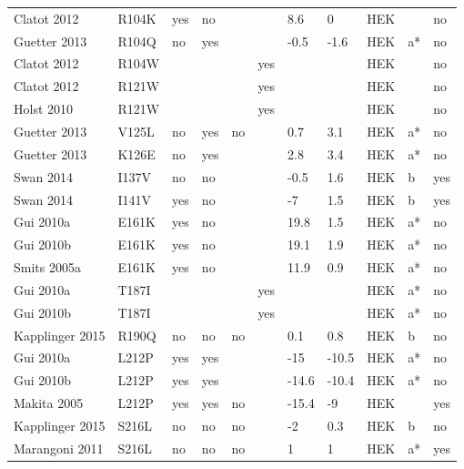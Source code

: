 \begin{tiny}
\begin{longtable}{p{4cm}|l|llll|ll|lll}
Clatot 2012\cite{Clatot2012MutationDB} & R104K & yes & no &  &  & 8.6 & 0 & HEK &  & no \\
Guetter 2013\cite{Guetter2013MutationDB} & R104Q & no & yes &  &  & -0.5 & -1.6 & HEK & a* & no \\
Clatot 2012\cite{Clatot2012MutationDB} & R104W &  &  &  & yes &  &  & HEK &  & no \\
Clatot 2012\cite{Clatot2012MutationDB} & R121W &  &  &  & yes &  &  & HEK &  & no \\
Holst 2010\cite{Holst2010MutationDB} & R121W &  &  &  & yes &  &  & HEK &  & no \\
Guetter 2013\cite{Guetter2013MutationDB} & V125L & no & yes & no &  & 0.7 & 3.1 & HEK & a* & no \\
Guetter 2013\cite{Guetter2013MutationDB} & K126E & no & yes &  &  & 2.8 & 3.4 & HEK & a* & no \\
Swan 2014\cite{Swan2014MutationDB} & I137V & no & no &  &  & -0.5 & 1.6 & HEK & b & yes \\
Swan 2014\cite{Swan2014MutationDB} & I141V & yes & no &  &  & -7 & 1.5 & HEK & b & yes \\
Gui 2010a\cite{Gui2010aMutationDB} & E161K & yes & no &  &  & 19.8 & 1.5 & HEK & a* & no \\
Gui 2010b\cite{Gui2010bMutationDB} & E161K & yes & no &  &  & 19.1 & 1.9 & HEK & a* & no \\
Smits 2005a\cite{Smits2005aMutationDB} & E161K & yes & no &  &  & 11.9 & 0.9 & HEK & a* & no \\
Gui 2010a\cite{Gui2010aMutationDB} & T187I &  &  &  & yes &  &  & HEK & a* & no \\
Gui 2010b\cite{Gui2010bMutationDB} & T187I &  &  &  & yes &  &  & HEK & a* & no \\
Kapplinger 2015\cite{Kapplinger2015MutationDB} & R190Q & no & no & no &  & 0.1 & 0.8 & HEK & b & no \\
Gui 2010a\cite{Gui2010aMutationDB} & L212P & yes & yes &  &  & -15 & -10.5 & HEK & a* & no \\
Gui 2010b\cite{Gui2010bMutationDB} & L212P & yes & yes &  &  & -14.6 & -10.4 & HEK & a* & no \\
Makita 2005\cite{Makita2005MutationDB} & L212P & yes & yes & no &  & -15.4 & -9 & HEK &  & yes \\
Kapplinger 2015\cite{Kapplinger2015MutationDB} & S216L & no & no & no &  & -2 & 0.3 & HEK & b & no \\
Marangoni 2011\cite{Marangoni2011MutationDB} & S216L & no & no & no &  & 1 & 1 & HEK & a* & yes \\

\end{longtable}
\end{tiny}
